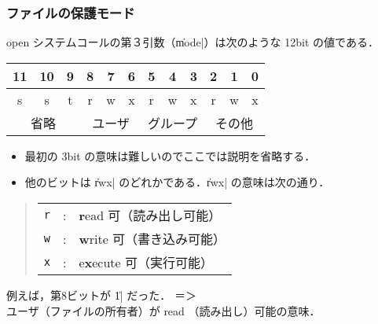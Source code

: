\documentclass{beamer}                 %
\begin{document}
\begin{frame}[fragile]
  \frametitle{ファイルの保護モード}
open システムコールの第３引数（\|mode|）は次のような 12bit の値である．

\begin{center}
{\ttfamily\small\begin{tabular}{|c|c|c||c|c|c||c|c|c||c|c|c|}
\multicolumn{1}{c}{11} &
\multicolumn{1}{c}{10} &
\multicolumn{1}{c}{ 9} &
\multicolumn{1}{c}{ 8} &
\multicolumn{1}{c}{ 7} &
\multicolumn{1}{c}{ 6} &
\multicolumn{1}{c}{ 5} &
\multicolumn{1}{c}{ 4} &
\multicolumn{1}{c}{ 3} &
\multicolumn{1}{c}{ 2} &
\multicolumn{1}{c}{ 1} &
\multicolumn{1}{c}{ 0} \\\hline
s  & s  & t & r & w & x & r & w & x & r & w & x \\\hline
\multicolumn{3}{c}{省略} &
\multicolumn{3}{c}{ユーザ} &
\multicolumn{3}{c}{グループ} &
\multicolumn{3}{c}{その他}
\end{tabular}}
\end{center}

\begin{itemize}
\item 最初の 3bit の意味は難しいのでここでは説明を省略する．
\item 他のビットは \|rwx| のどれかである．\|rwx| の意味は次の通り．
\end{itemize}

\begin{quote}
\begin{tabular}{c c l}
\texttt{r} & : & \textbf{r}ead 可（読み出し可能）   \\
\texttt{w} & : & \textbf{w}rite 可（書き込み可能）   \\
\texttt{x} & : & e\textbf{x}ecute 可（実行可能）
\end{tabular}
\end{quote}

例えば，第8ビットが \|1| だった． ＝＞\\
ユーザ（ファイルの所有者）が read （読み出し）可能の意味．
\end{frame}
\end{document}
